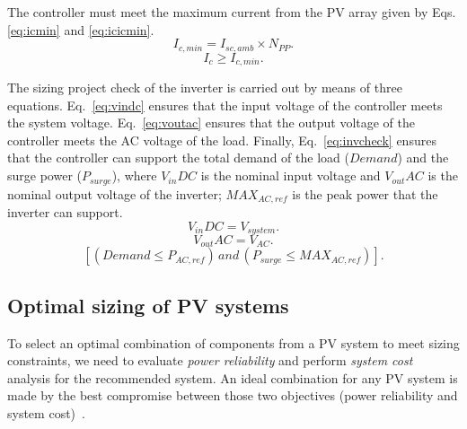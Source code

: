 \documentclass[10pt,conference]{IEEEtran}
\begin{document}
The controller must meet the maximum current from the PV array given by Eqs. \eqref{eq:icmin} and \eqref{eq:icicmin}.
\begin{equation}
\label{eq:icmin}
\scriptstyle I_{c,min} = \scriptstyle I_{sc,amb} \times \scriptstyle N_{PP}.
\end{equation}
%
\begin{equation}
\label{eq:icicmin}
\scriptstyle I_{c} \geq \scriptstyle I_{c,min}.
\end{equation}

The sizing project check of the inverter is carried out by means of three equations. Eq.~\eqref{eq:vindc} ensures that the input voltage of the controller meets the system voltage. Eq.~\eqref{eq:voutac} ensures that the output voltage of the controller meets the AC voltage of the load. Finally, Eq.~\eqref{eq:invcheck} ensures that the controller can support the total demand of the load ($Demand$) and the surge power ($P_{surge}$), where $V_{in}DC$ is the nominal input voltage and $V_{out}AC$ is the nominal output voltage of the inverter; $MAX_{AC,ref}$ is the peak power that the inverter can support.
%
\begin{equation}
\label{eq:vindc} 
\scriptstyle V_{in}DC = \scriptstyle V_{system}.
\end{equation}
%
\begin{equation}
\label{eq:voutac} 
\scriptstyle V_{out}AC = \scriptstyle V_{AC}.
\end{equation}
%
\begin{equation}
\label{eq:invcheck} 
\left[ (\scriptstyle Demand \leq \scriptstyle P_{AC,ref}) \, \scriptstyle and \, \scriptstyle (P_{surge} \leq MAX_{AC,ref}) \right].
\end{equation}
\subsection{Optimal sizing of PV systems}

To select an optimal combination of components from a PV system to meet sizing constraints, we need to evaluate \textit{power reliability} and perform \textit{system cost} analysis for the recommended system. An ideal combination for any PV system is made by the best compromise between those two objectives (power reliability and system cost)~\cite{Alsadi2018}. 
\end{document}
